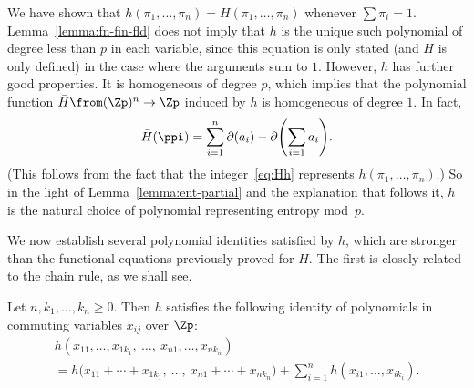
We have shown that $h(\pi_1, \ldots, \pi_n) = H(\pi_1, \ldots, \pi_n)$
whenever $\sum \pi_i = 1$.  Lemma~\ref{lemma:fn-fin-fld} does not imply
that $h$ is the unique such polynomial of degree less than $p$ in each
variable, since this equation is only stated (and $H$ is only defined) in
the case where the arguments sum to $1$.  However, $h$ has further good
properties.  It is homogeneous of degree $p$, which implies that the
polynomial function $\bar{H} \from (\Zp)^n \to \Zp$ induced by $h$ is
homogeneous of degree $1$.  In fact,
\[
\bar{H}(\ppi) 
= 
\sum_{i = 1}^n \partial(a_i) 
- \partial\Biggl( \sum_{i = 1} a_i \Biggr).
\]
(This follows from the fact that the integer~\eqref{eq:Hh} represents
$h(\pi_1, \ldots, \pi_n)$.)  So in the light of
Lemma~\ref{lemma:ent-partial} and the explanation that follows it, $h$ is
the natural choice of polynomial representing entropy mod~$p$.

We now establish several polynomial identities satisfied by $h$, which are
stronger than the functional equations previously proved for $H$.  The
first is closely related to the chain rule, as we shall see.

\begin{thm}
Let $n, k_1, \ldots, k_n \geq 0$.  Then $h$ satisfies the following
identity of polynomials in commuting variables $x_{ij}$ over $\Zp$:
% 
\begin{multline*}
h(x_{11}, \ldots, x_{1k_1}, 
\ \ldots, \ 
x_{n1}, \ldots, x_{nk_n})
\\
=
h\bigl( x_{11} + \cdots + x_{1k_1}, \ \ldots, \
x_{n1} + \cdots + x_{nk_n} \bigr)
+
\sum_{i = 1}^n h(x_{i1}, \ldots, x_{ik_i}).
\end{multline*}
\end{thm}

